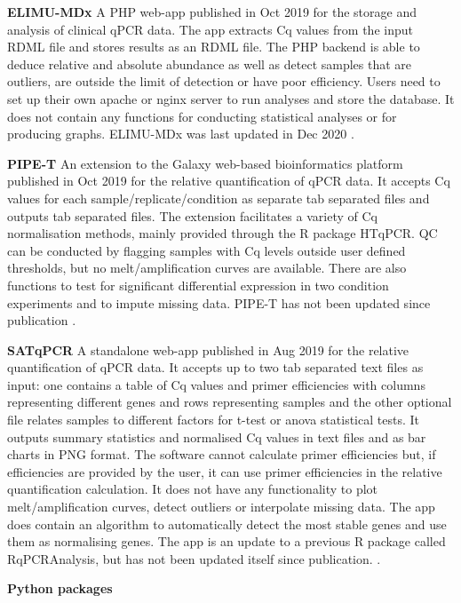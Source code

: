 \documentclass[../main.tex]{subfiles}
\begin{document}
\textbf{ELIMU-MDx} A PHP web-app published in Oct 2019 for the storage and analysis of clinical qPCR data. 
The app extracts Cq values from the input RDML file and stores results as an RDML file. 
The PHP backend is able to deduce relative and absolute abundance as well as detect samples that are outliers, are outside the limit of detection or have poor efficiency. 
Users need to set up their own apache or nginx server to run analyses and store the database. 
It does not contain any functions for conducting statistical analyses or for producing graphs. ELIMU-MDx was last updated in Dec 2020 \parencite{Krahenbuhl2019}.

\textbf{PIPE-T} An extension to the Galaxy web-based bioinformatics platform published in Oct 2019 for the relative quantification of qPCR data. 
It accepts Cq values for each sample/replicate/condition as separate tab separated files and outputs tab separated files. 
The extension facilitates a variety of Cq normalisation methods, mainly provided through the R package HTqPCR. 
QC can be conducted by flagging samples with Cq levels outside user defined thresholds, but no melt/amplification curves are available. 
There are also functions to test for significant differential expression in two condition experiments and to impute missing data. 
PIPE-T has not been updated since publication \parencite{Zanardi2019}.

\textbf{SATqPCR} A standalone web-app published in Aug 2019 for the relative quantification of qPCR data. 
It accepts up to two tab separated text files as input: one contains a table of Cq values and primer efficiencies with columns representing different genes and rows representing samples and the other optional file relates samples to different factors for t-test or anova statistical tests. 
It outputs summary statistics and normalised Cq values in text files and as bar charts in PNG format. 
The software cannot calculate primer efficiencies but, if efficiencies are provided by the user, it can use primer efficiencies in the relative quantification calculation. 
It does not have any functionality to plot melt/amplification curves, detect outliers or interpolate missing data. 
The app does contain an algorithm to automatically detect the most stable genes and use them as normalising genes. 
The app is an update to a previous R package called RqPCRAnalysis, but has not been updated itself since publication. \parencite{Rancurel2019}.


\textbf{Python packages}
\end{document}
